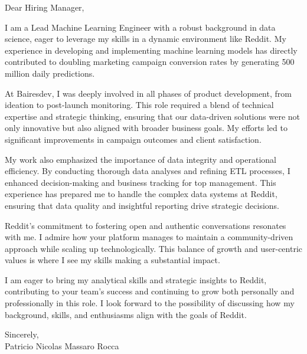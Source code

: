 \documentclass{article}
\begin{document}
\noindent Dear Hiring Manager,


I am a Lead Machine Learning Engineer with a robust background in data science, eager to leverage my skills in a dynamic environment like Reddit. My experience in developing and implementing machine learning models has directly contributed to doubling marketing campaign conversion rates by generating 500 million daily predictions.


At Bairesdev, I was deeply involved in all phases of product development, from ideation to post-launch monitoring. This role required a blend of technical expertise and strategic thinking, ensuring that our data-driven solutions were not only innovative but also aligned with broader business goals. My efforts led to significant improvements in campaign outcomes and client satisfaction.


My work also emphasized the importance of data integrity and operational efficiency. By conducting thorough data analyses and refining ETL processes, I enhanced decision-making and business tracking for top management. This experience has prepared me to handle the complex data systems at Reddit, ensuring that data quality and insightful reporting drive strategic decisions.


Reddit's commitment to fostering open and authentic conversations resonates with me. I admire how your platform manages to maintain a community-driven approach while scaling up technologically. This balance of growth and user-centric values is where I see my skills making a substantial impact.


I am eager to bring my analytical skills and strategic insights to Reddit, contributing to your team's success and continuing to grow both personally and professionally in this role. I look forward to the possibility of discussing how my background, skills, and enthusiasms align with the goals of Reddit.

\vspace{1cm}
\setlength{\parskip}{0em}
\begin{flushright}
Sincerely,\\
Patricio Nicolas Massaro Rocca
\end{flushright}
\end{document}
